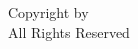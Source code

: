 


\thispagestyle{empty}



\hfill

\vfill

\begin{center}
\textcopyright\xspace Copyright by \myName \myYear\\
All Rights Reserved
\end{center}


\cleardoublepage